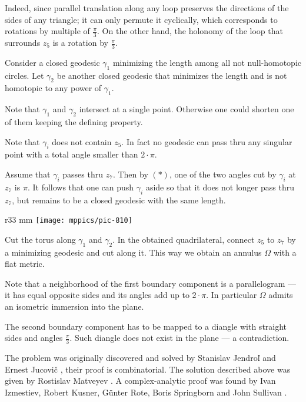 Indeed, since parallel translation along any loop preserves the directions of the sides of any triangle;
it can only permute it cyclically, which corresponds to rotations by multiple of $\tfrac\pi3$. 
On the other hand, the holonomy of the loop that surrounds $z_5$ is a rotation by $\tfrac\pi3$.

Consider a closed geodesic $\gamma_1$ minimizing the length among all not null-homotopic circles.
Let $\gamma_2$ be another closed geodesic that minimizes the length and is not homotopic to any power of $\gamma_1$.

Note that $\gamma_1$ and $\gamma_2$ intersect at a single point.
Otherwise one could shorten one of them keeping the defining property.

Note that $\gamma_i$ does not contain $z_5$.
In fact no geodesic can pass thru any singular point with a total angle smaller than $2\cdot\pi$.

Assume that $\gamma_i$ passes thru $z_7$.
Then by $({*})$, one of the two angles cut by $\gamma_i$ at $z_7$ is $\pi$.
It follows that one can push $\gamma_i$ aside so that it does not longer pass thru $z_7$, but remains to be a closed geodesic with the same length.

\begin{wrapfigure}{r}{33 mm}
\vskip0mm
\centering
\texttt{[image: mppics/pic-810]}
\end{wrapfigure}

Cut the torus along $\gamma_1$ and $\gamma_2$.
In the obtained quadrilateral, connect $z_5$ to $z_7$ by a minimizing geodesic and cut along it.
This way we obtain an annulus $\Omega$ with a flat metric.

Note that a neighborhood of the first boundary component is a parallelogram --- it has equal opposite sides and its angles add up to $2\cdot \pi$.
In particular $\Omega$ admits an isometric immersion into the plane.

The second boundary component has to be mapped to a diangle with straight sides and angles $\tfrac\pi3$.
Such diangle does not exist in the plane --- a contradiction.
\qeds

The problem was originally discovered and solved by {\selectfont Stanislav Jendro\v{l}}
and Ernest Jucovi\v{c} \cite{jendrol-jucovich},
their proof is combinatorial.
The solution described above was given by Rostislav Matveyev \cite{matveyev}.
A complex-analytic proof was found by 
Ivan Izmestiev, 
Robert Kusner, 
G\"unter Rote, 
Boris Springborn 
and John Sullivan \cite{izmestiev-rote-springborn-kusner}.

